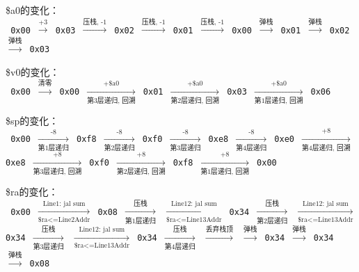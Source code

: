 \documentclass{article}
\begin{document}
            \$a0的变化： \\
            \texttt{
            0x00 $\xrightarrow{\text{+3}}$ 0x03 $\xrightarrow{\text{压栈, -1}}$ 0x02 $\xrightarrow{\text{压栈, -1}}$ 0x01 $\xrightarrow{\text{压栈, -1}}$ 0x00 $\xrightarrow{\text{弹栈}}$ 0x01 $\xrightarrow{\text{弹栈}}$ 0x02 $\xrightarrow{\text{弹栈}}$ 0x03
            ~\\}
            
            \$v0的变化： \\
            \texttt{
            0x00 $\xrightarrow{\text{清零}}$ 0x00 $\xrightarrow[\text{第3层递归, 回溯}]{\text{+\$a0}}$ 0x01 $\xrightarrow[\text{第2层递归, 回溯}]{\text{+\$a0}}$ 0x03 $\xrightarrow[\text{第1层递归, 回溯}]{\text{+\$a0}}$ 0x06
            ~\\}
            
            \$sp的变化： \\
            \texttt{
            0x00 $\xrightarrow[\text{第1层递归}]{\text{-8}}$ 0xf8 $\xrightarrow[\text{第2层递归}]{\text{-8}}$ 0xf0 $\xrightarrow[\text{第3层递归}]{\text{-8}}$ 0xe8 $\xrightarrow[\text{第4层递归}]{\text{-8}}$ 0xe0 $\xrightarrow[\text{第4层递归, 回溯}]{\text{+8}}$ 0xe8 $\xrightarrow[\text{第3层递归, 回溯}]{\text{+8}}$ 0xf0 $\xrightarrow[\text{第2层递归, 回溯}]{\text{+8}}$ 0xf8 $\xrightarrow[\text{第1层递归, 回溯}]{\text{+8}}$ 0x00
            ~\\}
            
            \$ra的变化： \\
            \texttt{
            0x00 $\xrightarrow[\text{\$ra<=Line2Addr}]{\text{Line1: jal sum}}$ 0x08 $\xrightarrow[\text{第1层递归}]{\text{压栈}}$ $\xrightarrow[\text{\$ra<=Line13Addr}]{\text{Line12: jal sum}}$ 0x34 $\xrightarrow[\text{第2层递归}]{\text{压栈}}$ $\xrightarrow[\text{\$ra<=Line13Addr}]{\text{Line12: jal sum}}$ 0x34 $\xrightarrow[\text{第3层递归}]{\text{压栈}}$ $\xrightarrow[\text{\$ra<=Line13Addr}]{\text{Line12: jal sum}}$ 0x34 $\xrightarrow[\text{第4层递归}]{\text{压栈}}$ $\xrightarrow{\text{丢弃栈顶}}$ $\xrightarrow{\text{弹栈}}$ 0x34 $\xrightarrow{\text{弹栈}}$ 0x34 $\xrightarrow{\text{弹栈}}$ 0x08
            }
            
\end{document}
